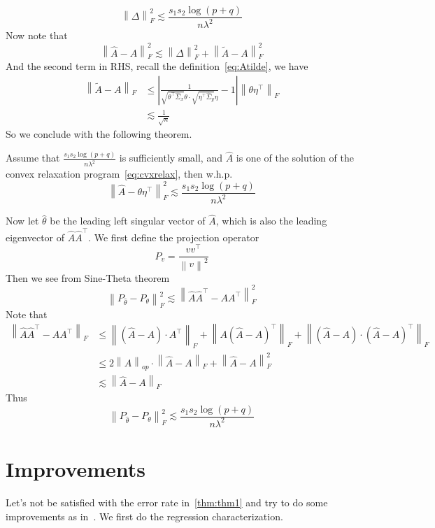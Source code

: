 \documentclass[12pt]{article}
\newcommand{\lam}{\lambda}
\newcommand{\tp}{^\top}
\newcommand{\bra}[1]{\left(#1\right)}
\newcommand{\abs}[1]{\left|#1\right|}
\newcommand{\norm}[1]{\left\|#1\right\|}
\newcommand{\wh}[1]{\widehat{#1}}
\newcommand{\wt}[1]{\widetilde{#1}}
\def\beq{\begin{equation}}
\def\eeq{\end{equation}}
\def\beqal{\begin{equation}\begin{aligned}}
\def\eeqal{\end{aligned}\end{equation}}
\begin{document}
\beq
\norm{\Delta}_F^2\lesssim \frac{s_1s_2\log(p+q)}{n\lam^2}
\eeq
Now note that
\beq
\norm{\wh{A}-A}_F^2\lesssim\norm{\Delta}_F^2+\norm{\wt{A}-A}_F^2
\eeq
And the second term in RHS, recall the definition~\ref{eq:Atilde}, we have
\beqal
\norm{\wt{A}-A}_F&\leq \abs{\frac{1}{\sqrt{\theta\tp\wh{\Sigma}_x}\theta\cdot \sqrt{\eta\tp\wh{\Sigma}_y}\eta}-1}\norm{\theta\eta\tp}_F\\
&\lesssim \frac{1}{\sqrt{n}}
\eeqal
So we conclude with the following theorem.
\begin{theorem}\label{thm:thm1}
Assume that $\frac{s_1s_2\log \bra{p+q}}{n\lam^2}$ is sufficiently small, and $\wh{A}$ is one of the solution of the convex relaxation program~\ref{eq:cvxrelax}, then w.h.p.
\beq
\norm{\wh{A}-\theta\eta\tp}_F^2\lesssim \frac{s_1s_2\log\bra{p+q}}{n\lam^2}
\eeq
\end{theorem}
Now let $\wh{\theta}$ be the leading left singular vector of $\wh{A}$, which is also the leading eigenvector of $\wh{A}\wh{A}\tp$. We first define the projection operator
\[
P_{v}=\frac{vv\tp}{\norm{v}^2}
\]
Then we see from Sine-Theta theorem
\beq
\norm{P_{\wh{\theta}}-P_\theta}_F^2\lesssim \norm{\wh{A}\wh{A}\tp-AA\tp}_F^2
\eeq
Note that
\beqal
\norm{\wh{A}\wh{A}\tp-AA\tp}_F&\leq \norm{\bra{\wh{A}-A}\cdot A\tp}_F+\norm{A\bra{\wh{A}-A}\tp}_F+\norm{\bra{\wh{A}-A}\cdot \bra{\wh{A}-A}\tp}_F\\
&\leq 2\norm{A}_{op}\cdot \norm{\wh{A}-A}_F+\norm{\wh{A}-A}_F^2\\
&\lesssim \norm{\wh{A}-A}_F
\eeqal
Thus
\beq\label{eq:init}
\norm{P_{\wh{\theta}}-P_\theta}_F^2\lesssim\frac{s_1s_2\log\bra{p+q}}{n\lam^2}
\eeq
\section{Improvements}
Let's not be satisfied with the error rate in~\ref{thm:thm1} and try to do some improvements as in~\cite{Ma_2013}. We first do the regression characterization.
\end{document}
